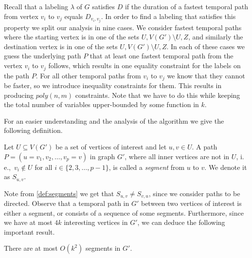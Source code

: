 \documentclass[a4paper,UKenglish,cleveref, autoref, thm-restate, anonymous]{lipics-v2021}
\newcommand{\ie}{i.\,e.,\ }
\newcommand{\deltaExact}{\textsc{Periodic TGR}}
\begin{document}
Recall that a labeling $\lambda$ of $G$ satisfies $D$ if the duration of a fastest temporal path from vertex $v_i$ to $v_j$ equals $D_{v_i, v_j}$.
In order to find a labeling that satisfies this property we split our analysis in nine cases.
We consider fastest temporal paths 
where the starting vertex is in one of the sets $U,V(G') \setminus U, Z$,
and similarly the destination vertex is in one of the sets $U,V(G') \setminus U, Z$.
In each of these cases we guess the underlying path $P$ that at least one fastest temporal path from the vertex $v_i$ to $v_j$ follows, 
which results in one equality constraint for the labels on the path $P$. 
For all other temporal paths from $v_i$ to $v_j$ we know that they cannot be faster, so we introduce inequality constraints for them.
This results in producing $poly(n,m)$ constraints. 
Note that we have to do this while keeping the total number of variables upper-bounded by some function in $k$.

For an easier understanding and the analysis of the algorithm we give the following definition.
\begin{definition}\label{def:segments}
    Let $U \subseteq V(G')$ be a set of vertices of interest and let $u,v \in U$.
    A path $P = (u=v_1,v_2, \dots, v_p = v)$  in graph $G'$, where all inner vertices are not in $U$, \ie $v_i \notin U$ for all $i \in \{ 2, 3, \dots, p-1\}$,
    is called a \emph{segment} from $u$ to $v$. We denote it as $S_{u,v}$.
\end{definition}
Note from \cref{def:segments} we get that $S_{u,v} \neq S_{v,u}$, since we consider paths to be directed. Observe that a temporal path in $G'$ between two vertices of interest is either a segment, or consists of a sequence of some segments. Furthermore, since we have at most $4k$ interesting vertices in $G'$, we can deduce the following important result.
\begin{corollary}\label{obs:FPT-k2segments}
    There are at most $O(k^2)$ segments in $G'$.
\end{corollary}
\end{document}
